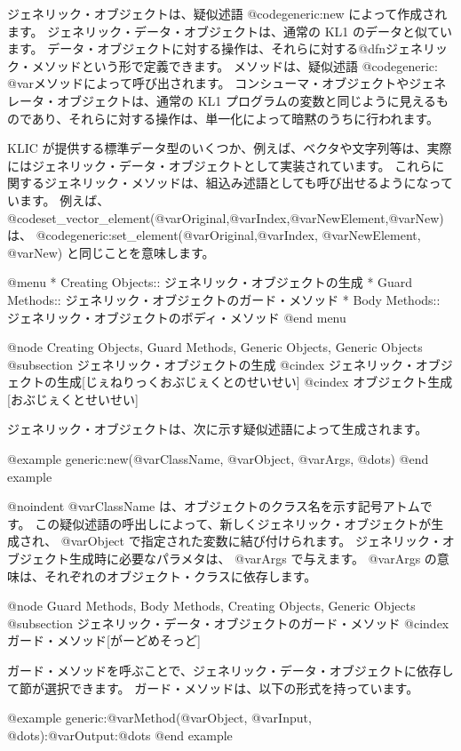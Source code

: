 ジェネリック・オブジェクトは、疑似述語 @code{generic:new} によって作成されます。
ジェネリック・データ・オブジェクトは、通常の KL1 のデータと似ています。
データ・オブジェクトに対する操作は、それらに対する@dfn{ジェネリック・メソッド}という形で定義できます。
メソッドは、疑似述語 @code{generic: @var{メソッド}}によって呼び出されます。
コンシューマ・オブジェクトやジェネレータ・オブジェクトは、通常の KL1 プログラムの変数と同じように見えるものであり、それらに対する操作は、単一化によって暗黙のうちに行われます。

KLIC が提供する標準データ型のいくつか、例えば、ベクタや文字列等は、実際にはジェネリック・データ・オブジェクトとして実装されています。
これらに関するジェネリック・メソッドは、組込み述語としても呼び出せるようになっています。
例えば、 @code{set_vector_element(@var{Original},@var{Index},@var{NewElement},@var{New})} は、 @code{generic:set_element(@var{Original},@var{Index}, @var{NewElement}, @var{New})} と同じことを意味します。

@menu
* Creating Objects::            ジェネリック・オブジェクトの生成
* Guard Methods::               ジェネリック・オブジェクトのガード・メソッド
* Body Methods::                ジェネリック・オブジェクトのボディ・メソッド
@end menu

@node Creating Objects, Guard Methods, Generic Objects, Generic Objects
@subsection ジェネリック・オブジェクトの生成
@cindex ジェネリック・オブジェクトの生成[じぇねりっくおぶじぇくとのせいせい]
@cindex オブジェクト生成[おぶじぇくとせいせい]

ジェネリック・オブジェクトは、次に示す疑似述語によって生成されます。

@example
generic:new(@var{ClassName}, @var{Object}, @var{Args}, @dots{})
@end example

@noindent
@var{ClassName} は、オブジェクトのクラス名を示す記号アトムです。
この疑似述語の呼出しによって、新しくジェネリック・オブジェクトが生成され、 @var{Object} で指定された変数に結び付けられます。
ジェネリック・オブジェクト生成時に必要なパラメタは、 @var{Args} で与えます。
@var{Args} の意味は、それぞれのオブジェクト・クラスに依存します。

@node Guard Methods, Body Methods, Creating Objects, Generic Objects
@subsection ジェネリック・データ・オブジェクトのガード・メソッド
@cindex ガード・メソッド[がーどめそっど]

ガード・メソッドを呼ぶことで、ジェネリック・データ・オブジェクトに依存して節が選択できます。
ガード・メソッドは、以下の形式を持っています。

@example
generic:@var{Method}(@var{Object}, @var{Input}, @dots{}):@var{Output}:@dots{}
@end example

